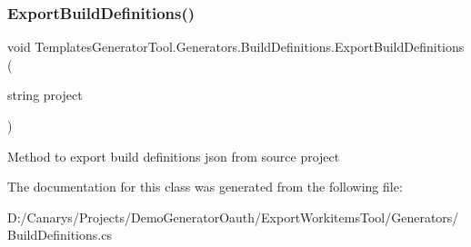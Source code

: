 \subsubsection{\texorpdfstring{Export\+Build\+Definitions()}{ExportBuildDefinitions()}}
{\footnotesize\ttfamily void Templates\+Generator\+Tool.\+Generators.\+Build\+Definitions.\+Export\+Build\+Definitions (\begin{DoxyParamCaption}\item[{string}]{project }\end{DoxyParamCaption})}



Method to export build definitions json from source project 



The documentation for this class was generated from the following file\+:\begin{DoxyCompactItemize}
\item 
D\+:/\+Canarys/\+Projects/\+Demo\+Generator\+Oauth/\+Export\+Workitems\+Tool/\+Generators/Build\+Definitions.\+cs\end{DoxyCompactItemize}
